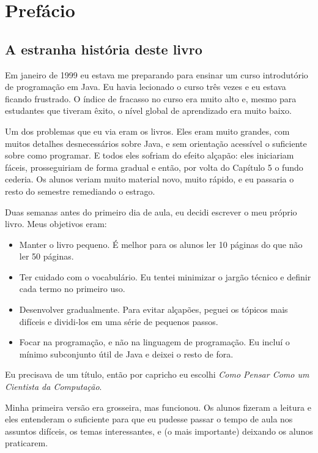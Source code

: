 \documentclass[10pt]{book}
\begin{document}
\chapter{Prefácio}

\section*{A estranha história deste livro}

Em janeiro de 1999 eu estava me preparando para ensinar um curso introdutório de
programação em Java. Eu havia lecionado o curso três vezes e eu estava ficando
frustrado. O índice de fracasso no curso era muito alto e, mesmo para
estudantes que tiveram êxito, o nível global de aprendizado era muito baixo.

Um dos problemas que eu via eram os livros.  
Eles eram muito grandes, com muitos detalhes desnecessários sobre Java, e
sem orientação acessível o suficiente sobre como programar. E todos eles
sofriam do efeito alçapão: eles iniciariam fáceis,
prosseguiriam de forma gradual e então, por volta do Capítulo 5 o fundo
cederia. Os alunos veriam muito material novo, muito rápido,
e eu passaria o resto do semestre remediando o estrago.

Duas semanas antes do primeiro dia de aula, eu decidi escrever o meu
próprio livro.
Meus objetivos eram:

\begin{itemize}

\item Manter o livro pequeno. É melhor para os alunos ler 10 páginas
do que não ler 50 páginas.

\item Ter cuidado com o vocabulário. Eu tentei minimizar o jargão técnico
e definir cada termo no primeiro uso.

\item Desenvolver gradualmente. Para evitar alçapões, peguei os tópicos
mais difíceis e dividi-los em uma série de pequenos passos.

\item Focar na programação, e não na linguagem de programação. Eu incluí
o mínimo subconjunto útil de Java e deixei o resto de fora.

\end{itemize}

Eu precisava de um título, então por capricho eu escolhi {\em Como Pensar Como
um Cientista da Computação}.

Minha primeira versão era grosseira, mas funcionou. Os alunos fizeram a leitura
e eles entenderam o suficiente para que eu pudesse passar o tempo de aula nos
assuntos difíceis, os temas interessantes, e (o mais importante) deixando
os alunos praticarem.
\end{document}
